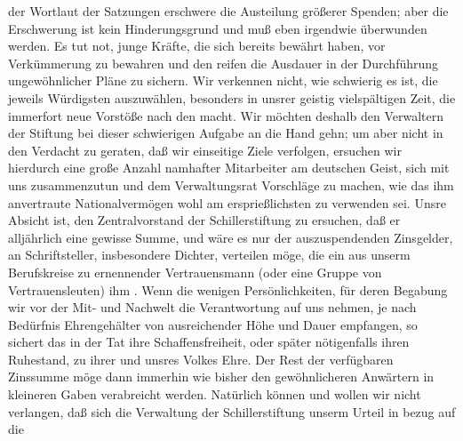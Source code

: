 \begin{ledgroupsized}[t]{13cm}
                    der Wortlaut der Satzungen erschwere die Austeilung größerer Spenden; aber die
                    Erschwerung ist kein Hinderungsgrund und muß eben irgendwie überwunden werden.
                    Es tut not, junge Kräfte, die sich bereits bewährt haben, vor Verkümmerung zu
                    bewahren und den reifen die Ausdauer in der Durchführung ungewöhnlicher Pläne zu
                    sichern.\pend
           \pstart
           Wir verkennen nicht, wie schwierig es ist, die jeweils Würdigsten auszuwählen,
                    besonders in unsrer geistig vielspältigen Zeit, die immerfort neue Vorstöße nach
                    den  macht. Wir möchten
                    deshalb den Verwaltern der Stiftung
                    bei dieser schwierigen Aufgabe an die Hand gehn; um aber nicht in den Verdacht
                    zu geraten, daß wir einseitige Ziele verfolgen, ersuchen wir hierdurch eine
                    große Anzahl namhafter Mitarbeiter am deutschen Geist, sich mit uns
                    zusammenzutun und dem Verwaltungsrat Vorschläge zu {\pb}machen, wie das ihm anvertraute Nationalvermögen wohl am ersprießlichsten zu
                    verwenden sei.\pend
           \pstart
           Unsre Absicht ist, den Zentralvorstand der Schillerstiftung zu ersuchen, daß er alljährlich eine gewisse Summe,
                    und wäre es nur  der auszuspendenden
                    Zinsgelder, an  Schriftsteller,
                    insbesondere Dichter, verteilen möge, die ein aus unserm Berufskreise zu
                    ernennender Vertrauensmann (oder eine Gruppe von Vertrauensleuten) ihm . Wenn die wenigen
                    Persönlichkeiten, für deren Begabung wir vor der Mit- und Nachwelt die
                    Verantwortung auf uns nehmen, je nach Bedürfnis Ehrengehälter von ausreichender
                    Höhe und Dauer empfangen, so sichert das in der Tat ihre Schaffensfreiheit, oder
                    später nötigenfalls ihren Ruhestand, zu ihrer und unsres Volkes Ehre. Der Rest
                    der verfügbaren Zinssumme möge dann immerhin wie bisher den gewöhnlicheren
                    Anwärtern in kleineren Gaben verabreicht werden.\pend
           \pstart
           Natürlich können und wollen wir nicht verlangen, daß sich die Verwaltung der Schillerstiftung unserm Urteil in bezug auf die

\end{ledgroupsized}
